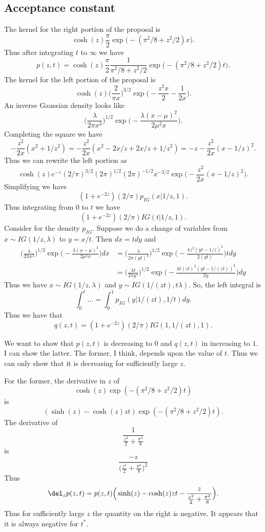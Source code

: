 \documentclass[]{article}
\begin{document}
\subsection{Acceptance constant}

The kernel for the right portion of the proposal is
\[
\cosh(z) \frac{\pi}{2} \exp \Big( - (\pi^2 / 8 + z^2 / 2) x \Big).
\]
Thus after integrating $t$ to $\infty$ we have
\[
p(z,t) = \cosh(z) \frac{\pi}{2} \frac{1}{\pi^2 / 8 + z^2 / 2} \exp \Big( - (\pi^2 / 8 +
z^2 / 2) t \Big).
\]
The kernel for the left portion of the proposal is
\[
\cosh(z) \Big(\frac{2}{\pi x}\Big)^{3/2} \exp \Big(-\frac{z^2x}{2} -
\frac{1}{2x} \Big).
\]
An inverse Gaussian density looks like
\[
\Big( \frac{\lambda}{2 \pi x^3} \Big)^{1/2} \exp \Big( - \frac{\lambda
  (x-\mu)^2}{2 \mu^2 x} \Big).
\]
Completing the square we have
\[
- \frac{z^2}{2 x} (x^2 + 1/z^2) = - \frac{z^2}{2 x} (x^2 - 2x/z + 2x/z + 1/z^2)
= -z - \frac{z^2}{2 x}(x-1/z)^2.
\]
Thus we can rewrite the left portion as
\[
\cosh(z) e^{-z} (2/\pi)^{3/2} (2\pi)^{1/2} (2\pi)^{-1/2} x^{-3/2} \exp \Big( -
\frac{z^2}{2x} (x-1/z)^2 \Big).
\]
Simplifying we have
\[
(1+e^{-2z}) (2/\pi) p_{IG}(x | 1/z, 1).
\]
Thus integrating from $0$ to $t$ we have
\[
(1+e^{-2z}) (2/\pi) IG(t | 1/z, 1).
\]
Consider for the density $p_{IG}$.  Suppose we do a change of variables from $x
\sim IG(1/z,\lambda)$ to $y = x/t$.  Then $dx = t dy$ and
\begin{align*}
\Big( \frac{\lambda}{2 \pi x^3} \Big)^{1/2} \exp \Big( - \frac{\lambda
  (x-\mu)^2}{2 \mu^2 x} \Big) dx
& = \Big( \frac{\lambda}{2 \pi (yt)^3} \Big)^{1/2} \exp \Big( - \frac{\lambda
  z^2 (yt-1/z)^2}{2 (yt)} \Big) t dy \\
& = \Big( \frac{\lambda t}{2 \pi y^3} \Big)^{1/2} \exp \Big( - \frac{\lambda
  t (zt)^2 (yt-1/(zt))^2}{2 y} \Big)  dy 
\end{align*}
Thus we have $x \sim IG(1/z, \lambda)$ and $y \sim IG(1/(zt), t \lambda)$.  So,
the left integral is
\[
\int_0^t \ldots = \int_0^1 p_{IG}(y | 1/(zt), 1/t) dy.
\]
Thus we have that 
\[
q(z,t) = (1+e^{-2z}) (2/\pi) IG(1, 1/(zt), 1).
\]

We want to show that $p(z,t)$ is decreasing to $0$ and $q(z,t)$ in increasing to
$1$.  I can show the latter.  The former, I think, depends upon the value of
$t$.  Thus we can only show that it is decreasing for sufficiently large $z$.

For the former, the derivative in $z$ of
\[
\cosh(z) \exp(-(\pi^2/8 + z^2/2)t)
\]
is
\[
(\sinh (z) - \cosh(z) z t) \exp(-(\pi^2/8 + z^2/2)t).
\]
The derivative of
\[
\frac{1}{\frac{z^2}{2} + \frac{\pi^2}{8}}
\]
is
\[
\frac{-z}{\Big( \frac{z^2}{2} + \frac{\pi^2}{8} \Big)^2}
\]
Thus
\[
\del_z p(z,t) = p(z,t) \Big( \sinh (z) - \cosh(z) z t - 
\frac{z}{\frac{z^2}{2} + \frac{\pi^2}{8}} \Big).
\]
Thus for sufficiently large $z$ the quantity on the right is negative.  It
appears that it is always negative for $t^*$.
\end{document}

